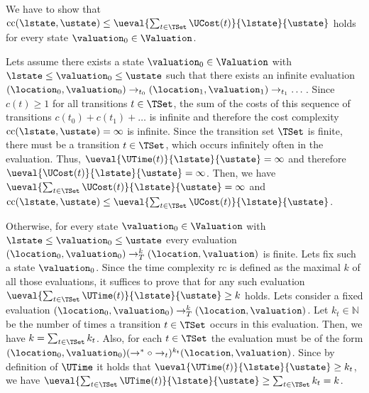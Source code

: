 We have to show that $\text{cc}(\lstate, \ustate) \leq \ueval{\sum_{t \in \TSet}\UCost(t)}{\lstate}{\ustate}$ holds for every state $\valuation_0 \in \Valuation$.

Lets assume there exists a state $\valuation_0 \in \Valuation$ with $\lstate \leq \valuation_0 \leq \ustate$ such that there exists an infinite evaluation $(\location_0, \valuation_0) \rightarrow_{t_0} (\location_1, \valuation_1) \rightarrow_{t_1} \dots$.
Since $c(t) \geq 1$ for all transitions $t \in \TSet$, the sum of the costs of this sequence of transitions $c(t_0) + c(t_1) + \dots$ is infinite and therefore the cost complexity $\text{cc}(\lstate, \ustate) = \infty$ is infinite.
Since the transition set $\TSet$ is finite, there must be a transition $t \in \TSet$, which occurs infinitely often in the evaluation.
Thus, $\ueval{\UTime(t)}{\lstate}{\ustate} = \infty$ and therefore $\ueval{\UCost(t)}{\lstate}{\ustate} = \infty$.
Then, we have $\ueval{\sum_{t \in \TSet}\UCost(t)}{\lstate}{\ustate} = \infty$ and $\text{cc}(\lstate, \ustate) \leq \ueval{\sum_{t \in \TSet}\UCost(t)}{\lstate}{\ustate}$.


Otherwise, for every state $\valuation_0 \in \Valuation$ with $\lstate \leq \valuation_0 \leq \ustate$ every evaluation $(\location_0, \valuation_0) \rightarrow^k_T (\location, \valuation)$ is finite.
Lets fix such a state $\valuation_0$.
Since the time complexity $\text{rc}$ is defined as the maximal $k$ of all those evaluations, it suffices to prove that for any such evaluation $\ueval{\sum_{t \in \TSet}\UTime(t)}{\lstate}{\ustate} \geq k$ holds.
Lets consider a fixed evaluation $(\location_0, \valuation_0) \rightarrow^k_T (\location, \valuation)$.
Let $k_t \in \mathbb{N}$ be the number of times a transition $t \in \TSet$ occurs in this evaluation.
Then, we have $k = \sum_{t \in \TSet} k_t$.
Also, for each $t \in \TSet$ the evaluation must be of the form $(\location_0, \valuation_0) (\rightarrow^* \circ \rightarrow_t)^{k_t} (\location, \valuation)$.
Since by definition of $\UTime$ it holds that $\ueval{\UTime(t)}{\lstate}{\ustate} \geq k_t$, we have $\ueval{\sum_{t \in \TSet}\UTime(t)}{\lstate}{\ustate} \geq \sum_{t \in \TSet} k_t = k$.
